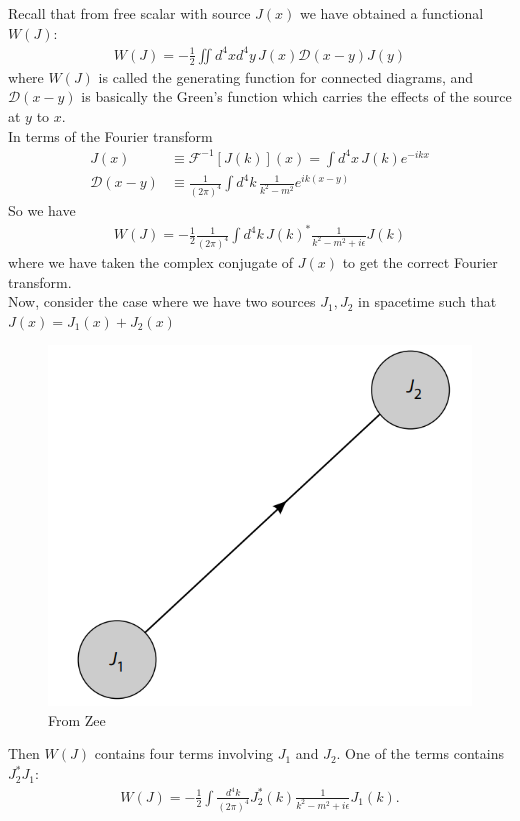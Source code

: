 \documentclass{book}
\theoremstyle{definition}
\newcommand{\F}{\mathcal{F}}
\newcommand{\f}[2]{\frac{#1}{#2}}
\newcommand{\D}{\mathcal{D}}
\begin{document}
Recall that from free scalar with source $J(x)$ we have obtained a functional $W(J)$:
\begin{align}
W(J) = -\f{1}{2}\iint d^4xd^4y\, J(x)\D(x-y)J(y)
\end{align}
where $W(J)$ is called the generating function for connected diagrams, and $\D(x-y)$ is basically the Green's function which carries the effects of the source at $y$ to $x$. \\


In terms of the Fourier transform 
\begin{align}
J(x) &\equiv  \F^{-1}[J(k)](x) = \int d^4x \, J(k)e^{-ikx}\\
\D(x-y) &\equiv \f{1}{(2\pi)^4}\int d^4k\,\f{1}{k^2 - m^2}e^{ik(x-y)}
\end{align}
So we have
\begin{align}
W(J) = -\f{1}{2}\f{1}{(2\pi)^4}\int d^4k\, J(k)^* \f{1}{k^2 - m^2 + i\epsilon}J(k) 
\end{align}
where we have taken the complex conjugate of $J(x)$ to get the correct Fourier transform.  \\

Now, consider the case where we have two sources $J_1, J_2$ in spacetime such that $J(x) = J_1(x) + J_2(x)$
\begin{figure}[!htb]
	\centering
	\includegraphics*[scale=0.7]{source}
	\caption{From Zee}
\end{figure}
Then $W(J)$ contains four terms involving $J_1$ and $J_2$. One of the terms contains $J_2^* J_1$:
\begin{align}
W(J) = -\f{1}{2}\int \f{d^4k}{(2\pi)^4} J_2^*(k)\f{1}{k^2 - m^2 + i\epsilon} J_1(k).
\end{align} 
\end{document}
